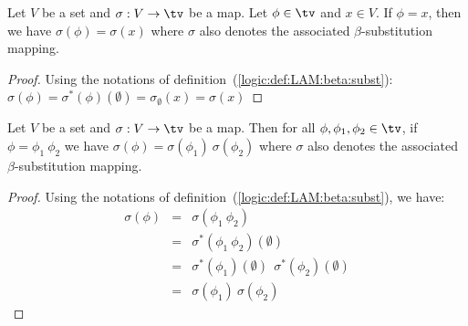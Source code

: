 \begin{prop}\label{logic:prop:LAM:subst:x}
    Let $V$ be a set and $\sigma:V\to\tv$ be a map. Let $\phi\in\tv$ 
    and $x\in V$. If $\phi = x$, then  we have $\sigma(\phi) = \sigma(x)$ 
    where $\sigma$ also denotes the associated $\beta$-substitution mapping.
\end{prop}
\begin{proof}
    Using the notations of definition~(\ref{logic:def:LAM:beta:subst}):
    $\sigma(\phi) = \sigma^{*}(\phi)(\emptyset) = \sigma_{\emptyset}(x)
    =\sigma(x)$
\end{proof}
\begin{prop}\label{logic:prop:LAM:subst:app}
    Let $V$ be a set and $\sigma:V\to\tv$ be a map. 
    Then for all  $\phi,\phi_{1},\phi_{2}\in\tv$, if $\phi = \phi_{1}\ \phi_{2}$
    we have $\sigma(\phi) = \sigma(\phi_{1})\ \sigma(\phi_{2})$ 
    where $\sigma$ also denotes the associated $\beta$-substitution mapping.
\end{prop}
\begin{proof}
    Using the notations of definition~(\ref{logic:def:LAM:beta:subst}), we have:
        \begin{eqnarray*}
            \sigma(\phi)&=&\sigma(\phi_{1}\ \phi_{2})\\
            &=&\sigma^{*}(\phi_{1}\ \phi_{2})(\emptyset)\\
            &=&\sigma^{*}(\phi_{1})(\emptyset)\ \ 
               \sigma^{*}(\phi_{2})(\emptyset)\\
            &=&\sigma(\phi_{1})\ \sigma(\phi_{2})
        \end{eqnarray*}
\end{proof}


